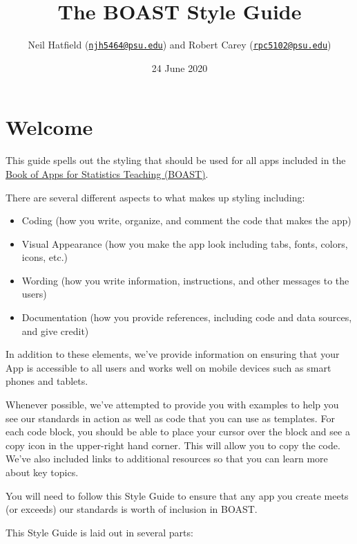 \documentclass[
]{book}
\title{The BOAST Style Guide}
\author{Neil Hatfield (\href{mailto:njh5464@psu.edu}{\nolinkurl{njh5464@psu.edu}}) and Robert Carey (\href{mailto:rpc5102@psu.edu}{\nolinkurl{rpc5102@psu.edu}})}
\date{24 June 2020}
\providecommand{\tightlist}{%
  \setlength{\itemsep}{0pt}\setlength{\parskip}{0pt}}
\begin{document}
\maketitle

{
\setcounter{tocdepth}{1}
\tableofcontents
}
\hypertarget{welcome}{%
\chapter*{Welcome}\label{welcome}}

This guide spells out the styling that should be used for all apps included in the \href{https://github.com/EducationShinyAppTeam/BOAST}{Book of Apps for Statistics Teaching (BOAST)}.

There are several different aspects to what makes up styling including:

\begin{itemize}
\tightlist
\item
  Coding (how you write, organize, and comment the code that makes the app)
\item
  Visual Appearance (how you make the app look including tabs, fonts, colors, icons, etc.)
\item
  Wording (how you write information, instructions, and other messages to the users)
\item
  Documentation (how you provide references, including code and data sources, and give credit)
\end{itemize}

In addition to these elements, we've provide information on ensuring that your App is accessible to all users and works well on mobile devices such as smart phones and tablets.

Whenever possible, we've attempted to provide you with examples to help you see our standards in action as well as code that you can use as templates. For each code block, you should be able to place your cursor over the block and see a copy icon in the upper-right hand corner. This will allow you to copy the code. We've also included links to additional resources so that you can learn more about key topics.

You will need to follow this Style Guide to ensure that any app you create meets (or exceeds) our standards is worth of inclusion in BOAST.

This Style Guide is laid out in several parts:
\end{document}

